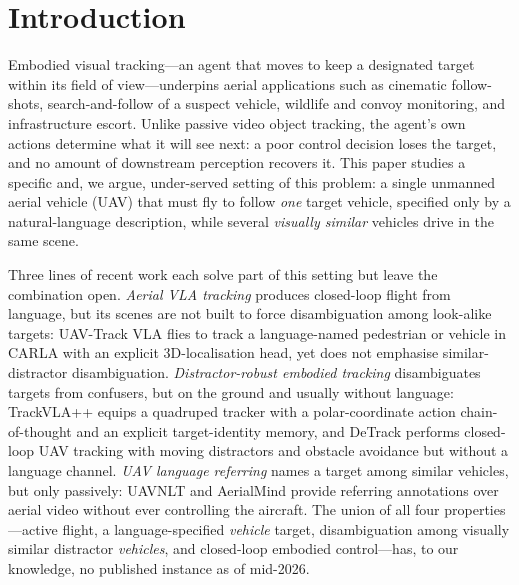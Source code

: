 \documentclass[11pt]{article}
\begin{document}
\section{Introduction}
\label{sec:intro}

Embodied visual tracking---an agent that moves to keep a designated target
within its field of view---underpins aerial applications such as cinematic
follow-shots, search-and-follow of a suspect vehicle, wildlife and convoy
monitoring, and infrastructure escort. Unlike passive video object
tracking, the agent's own actions determine what it will see next: a poor
control decision loses the target, and no amount of downstream perception
recovers it. This paper studies a specific and, we argue, under-served
setting of this problem: a single unmanned aerial vehicle (UAV) that must
fly to follow \emph{one} target vehicle, specified only by a natural-language
description, while several \emph{visually similar} vehicles drive in the
same scene.

Three lines of recent work each solve part of this setting but leave the
combination open. \emph{Aerial VLA tracking} produces closed-loop flight
from language, but its scenes are not built to force disambiguation among
look-alike targets: UAV-Track VLA \citep{uavtrackvla} flies to track a
language-named pedestrian or vehicle in CARLA with an explicit
3D-localisation head, yet does not emphasise similar-distractor
disambiguation. \emph{Distractor-robust embodied tracking} disambiguates
targets from confusers, but on the ground and usually without language:
TrackVLA++ \citep{trackvlapp} equips a quadruped tracker with a
polar-coordinate action chain-of-thought and an explicit target-identity
memory, and DeTrack \citep{detrack} performs closed-loop UAV tracking with
moving distractors and obstacle avoidance but without a language channel.
\emph{UAV language referring} names a target among similar vehicles, but
only passively: UAVNLT \citep{uavnlt} and AerialMind \citep{aerialmind}
provide referring annotations over aerial video without ever controlling
the aircraft. The union of all four properties---active flight, a
language-specified \emph{vehicle} target, disambiguation among visually
similar distractor \emph{vehicles}, and closed-loop embodied control---has,
to our knowledge, no published instance as of mid-2026.
\end{document}
